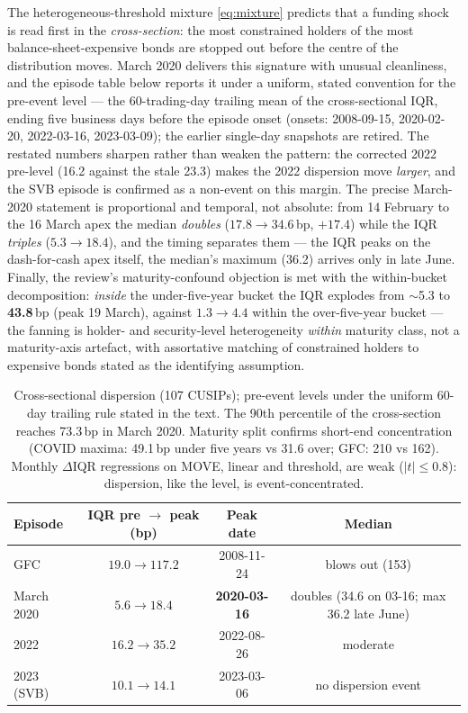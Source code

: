 \documentclass[11pt]{article}
\begin{document}
The heterogeneous-threshold mixture \eqref{eq:mixture} predicts that a funding shock is read first in the \emph{cross-section}: the most constrained holders of the most balance-sheet-expensive bonds are stopped out before the centre of the distribution moves. March 2020 delivers this signature with unusual cleanliness, and the episode table below reports it under a uniform, stated convention for the pre-event level --- the 60-trading-day trailing mean of the cross-sectional IQR, ending five business days before the episode onset (onsets: 2008-09-15, 2020-02-20, 2022-03-16, 2023-03-09); the earlier single-day snapshots are retired. The restated numbers sharpen rather than weaken the pattern: the corrected 2022 pre-level (16.2 against the stale 23.3) makes the 2022 dispersion move \emph{larger}, and the SVB episode is confirmed as a non-event on this margin. The precise March-2020 statement is proportional and temporal, not absolute: from 14 February to the 16 March apex the median \emph{doubles} ($17.8\to34.6$\,bp, $+17.4$) while the IQR \emph{triples} ($5.3\to18.4$), and the timing separates them --- the IQR peaks on the dash-for-cash apex itself, the median's maximum (36.2) arrives only in late June. Finally, the review's maturity-confound objection is met with the within-bucket decomposition: \emph{inside} the under-five-year bucket the IQR explodes from $\sim$5.3 to \textbf{43.8}\,bp (peak 19 March), against $1.3\to4.4$ within the over-five-year bucket --- the fanning is holder- and security-level heterogeneity \emph{within} maturity class, not a maturity-axis artefact, with assortative matching of constrained holders to expensive bonds stated as the identifying assumption.

\begin{table}[h!]
\centering\small
\begin{tabular}{lccc}
\toprule
Episode & IQR pre $\to$ peak (bp) & Peak date & Median \\
\midrule
GFC & $19.0\to117.2$ & 2008-11-24 & blows out (153) \\
March 2020 & $5.6\to18.4$ & \textbf{2020-03-16} & doubles (34.6 on 03-16; max 36.2 late June) \\
2022 & $16.2\to35.2$ & 2022-08-26 & moderate \\
2023 (SVB) & $10.1\to14.1$ & 2023-03-06 & no dispersion event \\
\bottomrule
\end{tabular}
\caption{Cross-sectional dispersion (107 CUSIPs); pre-event levels under the uniform 60-day trailing rule stated in the text. The 90th percentile of the cross-section reaches 73.3\,bp in March 2020. Maturity split confirms short-end concentration (COVID maxima: 49.1\,bp under five years vs 31.6 over; GFC: 210 vs 162). Monthly $\Delta$IQR regressions on MOVE, linear and threshold, are weak ($|t|\le0.8$): dispersion, like the level, is event-concentrated.}
\end{table}
\end{document}
